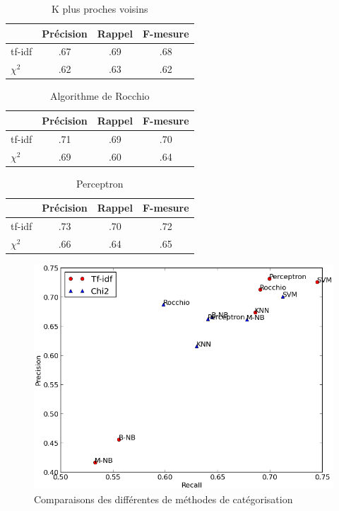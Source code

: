 \documentclass[a4paper,12pt]{article}
\begin{document}
		\begin{table}[h!]
			\centering
			\begin{tabular}{l|c c c}
				& Précision & Rappel & F-mesure\\
				\hline
				tf-idf & .67 & .69 & .68\\
				$\chi^2$ & .62 & .63 & .62\\
			\end{tabular}
			\caption{K plus proches voisins}
		\end{table}

		\begin{table}[h!]
			\centering
			\begin{tabular}{l|c c c}
				& Précision & Rappel & F-mesure\\
				\hline
				tf-idf & .71 & .69 & .70\\
				$\chi^2$ & .69 & .60 & .64\\
			\end{tabular}
			\caption{Algorithme de Rocchio}
		\end{table}

		\begin{table}[h!]
			\centering
			\begin{tabular}{l|c c c}
				& Précision & Rappel & F-mesure\\
				\hline
				tf-idf & .73 & .70 & .72\\
				$\chi^2$ & .66 & .64 & .65\\
			\end{tabular}
			\caption{Perceptron}
		\end{table}

		\begin{figure}[h!]
		\centering
		\includegraphics{graph.png}
		\caption{Comparaisons des différentes de méthodes de catégorisation}
		\end{figure}
\end{document}
